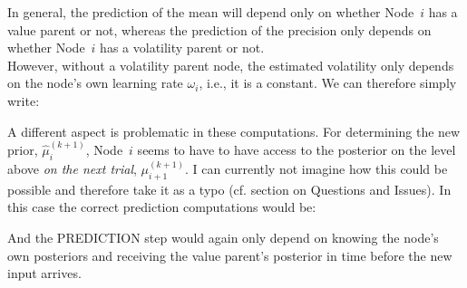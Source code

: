 In general, the prediction of the mean will depend only on whether Node~$i$ has a value parent or not, whereas the prediction of the precision only depends on whether Node~$i$ has a volatility parent or not. \\

However, without a volatility parent node, the estimated volatility only depends on the node's own learning rate $\omega_i$, i.e., it is a constant. We can therefore simply write:
\vspace{0.5cm}

\noindent
{}%
\vspace{0.5cm}

\noindent

A different aspect is problematic in these computations. For determining the new prior, $\hat{\mu}_i^{(k+1)}$, Node~$i$ seems to have to have access to the posterior on the level above \textit{on the next trial}, $\mu_{i+1}^{(k+1)}$. I can currently not imagine how this could be possible and therefore take it as a typo (cf. section on Questions and Issues). In this case the correct prediction computations would be:
\vspace{0.5cm}

\noindent
{}%
\vspace{0.5cm}

\noindent

And the \textsf{PREDICTION step} would again only depend on knowing the node's own posteriors and receiving the value parent's posterior in time before the new input arrives. 
